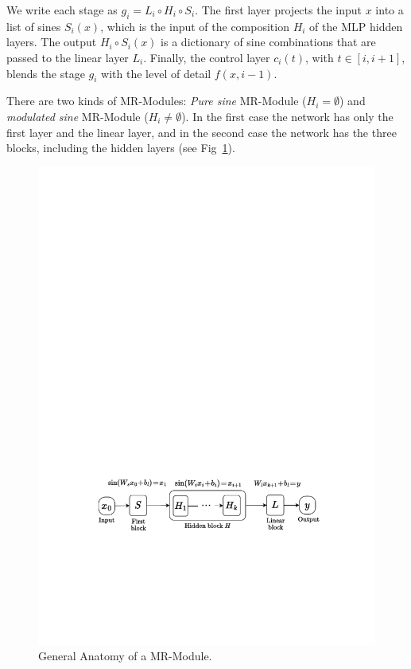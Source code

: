 We write each stage as $g_i=L_i\circ H_i\circ S_i$. The first layer projects the input $x$ into a list of sines $S_i(x)$, which is the input of the composition $H_i$ of the MLP hidden layers. The output $H_i\circ S_i(x)$ is a dictionary of sine combinations that are passed to the linear layer $L_i$. Finally, the control layer $c_i(t)$, with $t\in[i,i+1]$, blends the stage $g_i$ with the level of detail $f(x,i-1)$. 

There are two kinds of MR-Modules: \emph{Pure sine} MR-Module ($H_i=\emptyset$) and \emph{modulated sine} MR-Module ($H_i\neq\emptyset$). In the first case the network has only the first layer and the linear layer, and in the second case the network has the three blocks, including the hidden layers (see Fig~\ref{f:mr-module}).

\begin{figure}[!h]
\centering
% 
\includegraphics[width=\linewidth]{img/ch4/diagram_mr_module.pdf}
\caption{General Anatomy of a MR-Module.}
\label{f:mr-module}
\end{figure}


